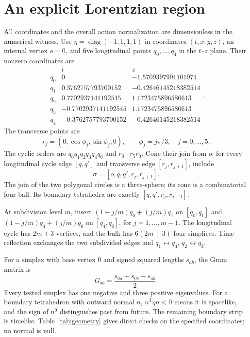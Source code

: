\documentclass[11pt]{article}
\theoremstyle{remark}\newtheorem{remark}[theorem]{Remark}
\DeclareMathOperator{\diag}{diag}
\begin{document}
\section{An explicit Lorentzian region}
\label{sec:geometry}
All coordinates and the overall action normalization are dimensionless in the numerical witness.
Use $\eta=\diag(-1,1,1,1)$ in coordinates $(t,x,y,z)$, an internal vertex $o=0$, and five longitudinal points $q_0,\ldots,q_4$ in the $t$--$z$ plane.
Their nonzero coordinates are
\begin{equation}
\begin{array}{c|rr}
 &t&z\\\hline
q_0&0&-1.5709397991101974\\
q_1&0.3762757793700152&-0.42646145218382514\\
q_2&0.7702937141192545& 1.1723475896580613\\
q_3&-0.7702937141192545&1.1723475896580613\\
q_4&-0.3762757793700152&-0.42646145218382514
\end{array}.
\label{eq:qpoints}
\end{equation}
The transverse points are
\begin{equation}
r_j=(0,\cos\phi_j,\sin\phi_j,0),\qquad
\phi_j=j\pi/3,\quad j=0,\ldots,5.
\label{eq:rpoints}
\end{equation}
The cyclic orders are $q_0q_1q_2q_3q_4q_0$ and $r_0\cdots r_5r_0$.
Cone their join from $o$: for every longitudinal cycle edge $[q,q']$ and transverse edge $[r_j,r_{j+1}]$, include
\begin{equation}
\sigma=[o,q,q',r_j,r_{j+1}].
\label{eq:simplices}
\end{equation}
The join of the two polygonal circles is a three-sphere; its cone is a combinatorial four-ball.
Its boundary tetrahedra are exactly $[q,q',r_j,r_{j+1}]$.

At subdivision level $m$, insert $(1-j/m)q_0+(j/m)q_1$ on $[q_0,q_1]$ and $(1-j/m)q_4+(j/m)q_0$ on $[q_4,q_0]$, for $j=1,\ldots,m-1$.
The longitudinal cycle has $2m+3$ vertices, and the bulk has $6(2m+3)$ four-simplices.
Time reflection exchanges the two subdivided edges and $q_1\leftrightarrow q_4$, $q_2\leftrightarrow q_3$.

For a simplex with base vertex $0$ and signed squared lengths $s_{ab}$, the Gram matrix is
\begin{equation}
G_{ab}=\frac{s_{0a}+s_{0b}-s_{ab}}2.
\label{eq:gram}
\end{equation}
Every tested simplex has one negative and three positive eigenvalues.
For a boundary tetrahedron with outward normal $n$, $n^T\eta n<0$ means it is spacelike, and the sign of $n^0$ distinguishes past from future.
The remaining boundary strip is timelike.
Table~\ref{tab:geometry} gives direct checks on the specified coordinates; no normal is null.
\end{document}
